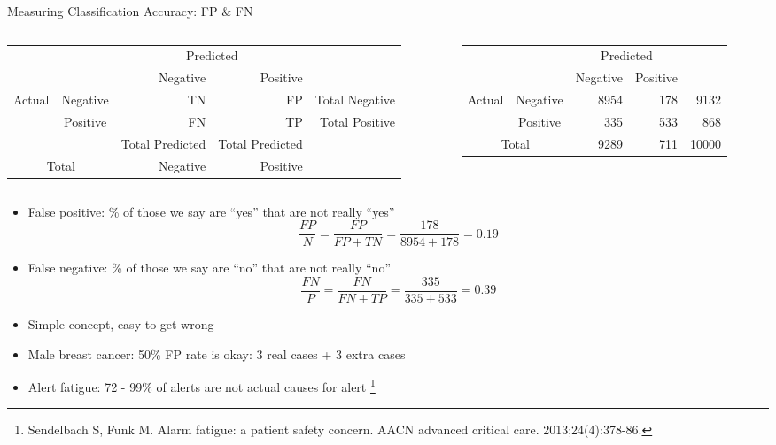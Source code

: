 \documentclass[aspectratio=169]{beamer}
\begin{document}
\begin{frame}{Measuring Classification Accuracy: FP \& FN}

\begin{columns}
\begin{column}{0.5\textwidth}
{\tiny
\begin{tabular}{|c|c|r|r|r|} \hline
\multicolumn{2}{|c|}{}   &   \multicolumn{2}{c|}{Predicted}  & \\ \cline{3-4}
\multicolumn{2}{|c|}{} & Negative & Positive  & \\ \hline  
\multirow{2}{*}{Actual} & Negative & TN & FP  & Total Negative \\ \cline{2-5}
 & Positive & FN & TP  & Total Positive \\ \hline \hline
 \multicolumn{2}{|c|}{} &  Total Predicted & Total Predicted &  \\ 
 \multicolumn{2}{|c|}{Total} &  Negative&  Positive & \\ \hline
 \end{tabular}
 }
 \end{column}
\begin{column}{0.5\textwidth}
{\tiny
\begin{tabular}{|c|c|r|r|r|} \hline
\multicolumn{2}{|c|}{}   &   \multicolumn{2}{c|}{Predicted}  & \\ \cline{3-4}
\multicolumn{2}{|c|}{} & Negative & Positive  & \\ \hline  
\multirow{2}{*}{Actual} & Negative & 8954 & 178  & 9132 \\ \cline{2-5}
 & Positive & 335 & 533  & 868 \\ \hline \hline
 \multicolumn{2}{|c|}{Total} & 9289 & 711  & 10000\\ \hline
 \end{tabular}
 }
 \end{column}
 \end{columns}
\small{
	\begin{itemize}
	\item False positive: \% of those we say are ``yes'' that are not really ``yes''
	$$\frac{FP}{N} = \frac{FP}{FP + TN} = \frac{178}{8954 + 178} = 0.19$$
	\item False negative: \% of those we say are ``no'' that are not really ``no''
	$$\frac{FN}{P} = \frac{FN}{FN + TP} = \frac{335}{335 + 533} = 0.39$$
	\item Simple concept, easy to get wrong
	\item Male breast cancer: 50\% FP rate is okay: 3 real cases + 3 extra cases
	\item Alert fatigue: 72 - 99\%  of alerts are not actual causes for alert  \footnote{Sendelbach S, Funk M. Alarm fatigue: a patient safety concern. AACN advanced critical care. 2013;24(4):378-86.}
	\end{itemize}
	}
\end{frame}
\end{document}

